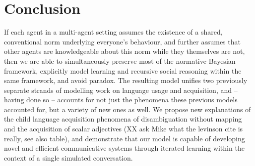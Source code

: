 \documentclass{article} %
\begin{document}
%




\section{Conclusion}

If each agent in a multi-agent setting assumes the existence of a
shared, conventional norm underlying everyone's behaviour, and further
assumes that other agents are knowledgeable about this norm while they
themselves are not, then we are able to simultaneously preserve most
of the normative Bayesian framework, explicitly model learning and
recursive social reasoning within the same framework, and avoid
paradox. The resulting model unifies two previously separate strands
of modelling work on language usage and acquisition, and -- having
done so -- accounts for not just the phenomena these previous models
accounted for, but a variety of new ones as well. We propose new
explanations of the child language acquisition phenomena of
disambiguation without mapping \cite{horst2008} and the acquisition of
scalar adjectives (XX ask Mike what the levinson cite is really, see
also table), and demonstrate that our model is capable of developing
novel and efficient communicative systems through iterated learning
within the context of a single simulated conversation.
\end{document}
